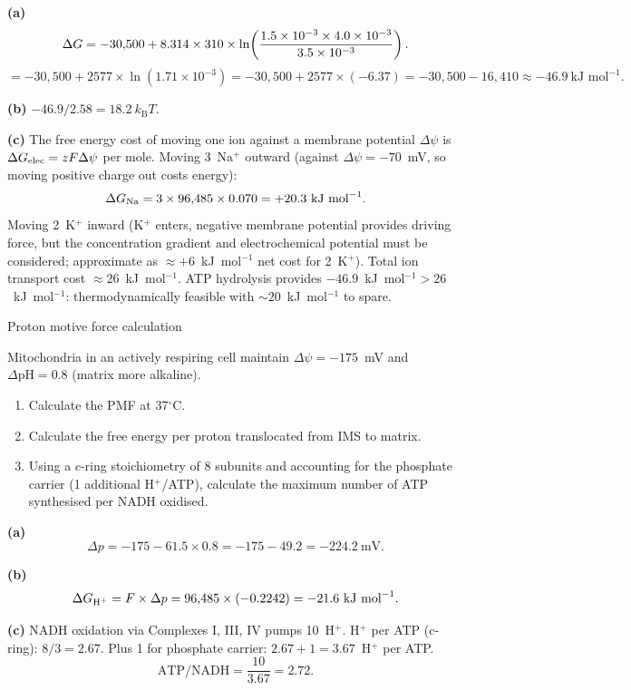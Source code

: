 \documentclass[12pt, a4paper, oneside]{report}
\begin{document}
\begin{solution}
  \textbf{(a)}
  \[
    \Delta G = -30{,}500 + 8.314 \times 310
          \times \ln\!\left(\frac{1.5\times10^{-3}\times4.0\times10^{-3}}
                                  {3.5\times10^{-3}}\right).
  \]
  \[
    = -30{,}500 + 2577 \times \ln(1.71\times10^{-3})
    = -30{,}500 + 2577 \times (-6.37)
    = -30{,}500 - 16{,}410 \approx -46.9~\text{kJ~mol}^{-1}.
  \]

  \textbf{(b)} $-46.9 / 2.58 = 18.2~k_\mathrm{B}T$.

  \textbf{(c)} The free energy cost of moving one ion against a membrane
  potential $\Delta\psi$ is $\Delta G_\text{elec} = zF\Delta\psi$ per mole.
  Moving 3~Na$^+$ outward (against $\Delta\psi = -70$~mV, so moving
  positive charge out costs energy):
  \[
    \Delta G_\text{Na} = 3 \times 96{,}485 \times 0.070 = +20.3~\text{kJ~mol}^{-1}.
  \]
  Moving 2~K$^+$ inward (K$^+$ enters, negative membrane potential
  provides driving force, but the concentration gradient and
  electrochemical potential must be considered; approximate as
  $\approx +6$~kJ~mol$^{-1}$ net cost for 2~K$^+$).
  Total ion transport cost $\approx 26$~kJ~mol$^{-1}$.
  ATP hydrolysis provides $-46.9$~kJ~mol$^{-1} > 26$~kJ~mol$^{-1}$:
  thermodynamically feasible with $\sim 20$~kJ~mol$^{-1}$ to spare.
\end{solution}

\begin{problem}{\enspace{}\enspace
  Proton motive force calculation}

  Mitochondria in an actively respiring cell maintain $\Delta\psi =
  -175$~mV and $\Delta\mathrm{pH} = 0.8$ (matrix more alkaline).

  \begin{enumerate}
    \item Calculate the PMF at 37$^\circ$C.
    \item Calculate the free energy per proton translocated from IMS
          to matrix.
    \item Using a $c$-ring stoichiometry of 8 subunits and accounting
          for the phosphate carrier (1 additional H$^+$/ATP), calculate
          the maximum number of ATP synthesised per NADH oxidised.
  \end{enumerate}
\end{problem}

\begin{solution}
  \textbf{(a)}
  \[
    \Delta p = -175 - 61.5 \times 0.8 = -175 - 49.2 = -224.2~\text{mV}.
  \]

  \textbf{(b)}
  \[
    \Delta G_{\text{H}^+} = F \times \Delta p = 96{,}485 \times (-0.2242)
    = -21.6~\text{kJ~mol}^{-1}.
  \]

  \textbf{(c)} NADH oxidation via Complexes I, III, IV pumps 10~H$^+$.
  H$^+$ per ATP (c-ring): $8/3 = 2.67$. Plus 1 for phosphate carrier:
  $2.67 + 1 = 3.67$~H$^+$ per ATP.
  \[
    \text{ATP/NADH} = \frac{10}{3.67} = 2.72.
  \]
\end{solution}
\end{document}
